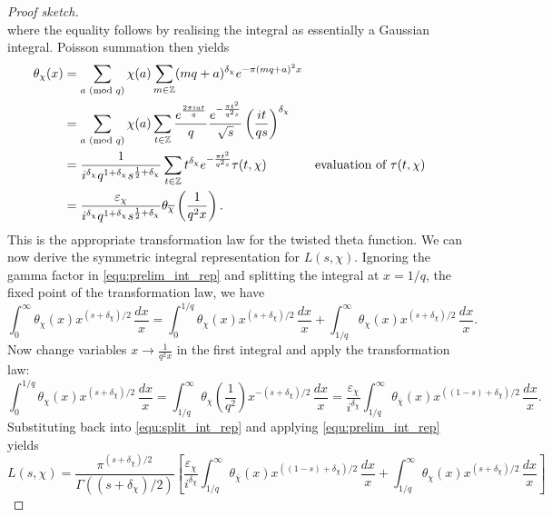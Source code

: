 \documentclass[12pt,reqno]{amsart}
\theoremstyle{definition}
\numberwithin{equation}{section}
\renewcommand{\mod}[1]{{\ifmmode\text{\rm\ (mod~$#1$)}\else\discretionary{}{}{\hbox{ }}\rm(mod~$#1$)\fi}}
\newcommand{\Z}{{\mathbb Z}}
\begin{document}
\begin{proof}[Proof sketch]
\[     \]
     where the equality follows by realising the integral as essentially a Gaussian integral. Poisson summation then yields
     \begin{align*}
        \theta_{\chi}(x) &= \sum_{a \mod{q}}\chi(a)\sum_{m \in \Z}(mq+a)^{\delta_{\chi}}e^{-\pi(mq+a)^{2}x} \\
        &= \sum_{a \mod{q}}\chi(a)\sum_{t \in \Z}\frac{e^{\frac{2\pi iat}{q}}}{q}\frac{e^{-\frac{\pi t^{2}}{q^{2}s}}}{\sqrt{s}}\left(\frac{it}{qs}\right)^{\delta_{\chi}} \\
        &= \frac{1}{i^{\delta_{\chi}}q^{1+\delta_{\chi}}s^{\frac{1}{2}+\delta_{\chi}}}\sum_{t \in \Z}t^{\delta_{\chi}}e^{-\frac{\pi t^{2}}{q^{2}s}}\tau(t,\chi) && \text{evaluation of $\tau(t,\chi)$}\\
        &= \frac{\varepsilon_{\chi}}{i^{\delta_{\chi}}q^{1+\delta_{\chi}}s^{\frac{1}{2}+\delta_{\chi}}}\theta_{\overline{\chi}}\left(\frac{1}{q^{2}x}\right).
     \end{align*}
     This is the appropriate transformation law for the twisted theta function. We can now derive the symmetric integral representation for $L(s,\chi)$. Ignoring the gamma factor in \ref{equ:prelim_int_rep} and splitting the integral at $x = 1/q$, the fixed point of the transformation law, we have
     \begin{equation}\label{equ:split_int_rep}
        \int_{0}^{\infty}\theta_{\chi}(x)x^{(s+\delta_{\chi})/2}\,\frac{dx}{x} = \int_{0}^{1/q}\theta_{\chi}(x)x^{(s+\delta_{\chi})/2}\,\frac{dx}{x}+\int_{1/q}^{\infty}\theta_{\chi}(x)x^{(s+\delta_{\chi})/2}\,\frac{dx}{x}.
     \end{equation}
     Now change variables $x \to \frac{1}{q^{2}x}$ in the first integral and apply the transformation law:
     \[
        \int_{0}^{1/q}\theta_{\chi}(x)x^{(s+\delta_{\chi})/2}\,\frac{dx}{x} = \int_{1/q}^{\infty}\theta_{\chi}\left(\frac{1}{q^{2}}\right)x^{-(s+\delta_{\chi})/2}\,\frac{dx}{x} = \frac{\varepsilon_{\chi}}{i^{\delta_{\chi}}}\int_{1/q}^{\infty}\theta_{\overline{\chi}}(x)x^{((1-s)+\delta_{\chi})/2}\,\frac{dx}{x}.
     \]
     Substituting back into \ref{equ:split_int_rep} and applying \ref{equ:prelim_int_rep} yields
     \begin{equation}\label{equ:a_sym_int_rep}
        L(s,\chi) = \frac{\pi^{(s+\delta_{\chi})/2}}{\Gamma\left((s+\delta_{\chi})/2\right)}\left[\frac{\varepsilon_{\chi}}{i^{\delta_{\chi}}}\int_{1/q}^{\infty}\theta_{\overline{\chi}}(x)x^{((1-s)+\delta_{\chi})/2}\,\frac{dx}{x}+\int_{1/q}^{\infty}\theta_{\chi}(x)x^{(s+\delta_{\chi})/2}\,\frac{dx}{x}\right]
     \end{equation}
    \end{proof}
 
\end{document}

